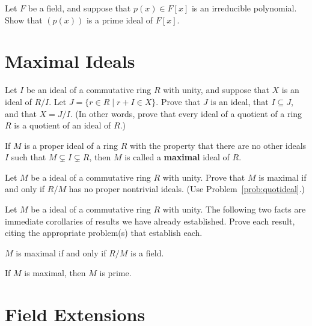\begin{problem}
Let \(F\) be a field, and suppose that \(p(x) \in F[x]\) is an irreducible polynomial. Show that \((p(x))\) is a prime ideal of \(F[x]\).
\end{problem}

\section{Maximal Ideals}

\begin{problem}\label{prob:quotideal}
Let \(I\) be an ideal of a commutative ring \(R\) with unity, and suppose that \(X\) is an ideal of \(R/I\). Let \(J = \{r \in R \mid r+I \in X\}\). Prove that \(J\) is an ideal, that \(I \subseteq J\), and that \(X = J/I\). (In other words, prove that every ideal of a quotient of a ring \(R\) is a quotient of an ideal of \(R\).)
\end{problem}

\begin{definition}
If \(M\) is a proper ideal of a ring \(R\) with the property that there are no other ideals \(I\) such that \(M \subsetneq I \subsetneq R\), then \(M\) is called a \textbf{maximal} ideal of \(R\).
\end{definition}

\begin{problem}
Let \(M\) be a ideal of a commutative ring \(R\) with unity. Prove that \(M\) is maximal if and only if \(R/M\) has no proper nontrivial ideals. (Use Problem~\ref{prob:quotideal}.)
\end{problem}

\begin{problem}
Let \(M\) be a ideal of a commutative ring \(R\) with unity. The following two facts are immediate corollaries of results we have already established. Prove each result, citing the appropriate problem(s) that establish each.
\begin{problemparts}
  \item \(M\) is maximal if and only if \(R/M\) is a field.
  \item If \(M\) is maximal, then \(M\) is prime.
\end{problemparts}
\end{problem}

\section{Field Extensions}

